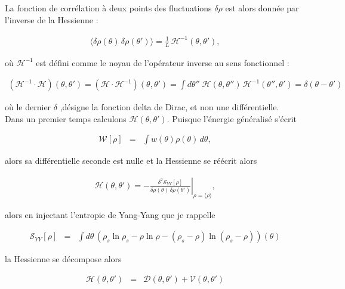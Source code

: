La fonction de corrélation à deux points des fluctuations \( \delta \rho \) est alors donnée par l’inverse de la Hessienne :

\begin{eqnarray}
    \langle \delta \rho(\theta) \, \delta \rho(\theta') \rangle = \frac{1}{L} \, \mathcal{H}^{-1}(\theta, \theta'),
    \label{chap:fluctu:eq:fluctuations}
\end{eqnarray}

où \( \mathcal{H}^{-1} \) est défini comme le noyau de l’opérateur inverse au sens fonctionnel :

\begin{eqnarray}
     (\mathcal{H}^{-1} \cdot  \mathcal{H})(\theta, \theta')  = (\mathcal{H}\cdot  \mathcal{H}^{-1})(\theta, \theta') = \int d\theta'' \; \mathcal{H}(\theta, \theta'') \, \mathcal{H}^{-1}(\theta'', \theta') = \delta(\theta - \theta')
     \label{chap:fluctu:eq:hessienner.prod.inv} 
\end{eqnarray}

où le dernier $\delta$ ,désigne la fonction delta de Dirac, et non une différentielle.\\

Dans un premier temps calculons $\mathcal{H}(\theta, \theta')$. Puisque l'énergie généralisé s'écrit

\begin{eqnarray}
	\mathcal{W}[\rho] & = & \int w(\theta) \rho(\theta) \, d \theta , 	
\end{eqnarray}

alors sa différentielle seconde est nulle et la Hessienne se réécrit alors 

\begin{eqnarray}
	\mathcal{H}(\theta, \theta') = - \left. \frac{\delta^2\mathcal{S}_{YY}[\rho]}{\delta \rho(\theta) \, \delta \rho(\theta')} \right|_{\rho = \langle \rho \rangle},		
\end{eqnarray}

alors en injectant l'entropie de Yang-Yang que je rappelle 

\begin{eqnarray}
	\mathcal{S}_{YY}[\rho] & = & \int d \theta \, \left ( \rho_s \ln \rho_s - \rho \ln \rho - ( \rho_s - \rho ) \ln ( \rho_s - \rho ) \right ) ( \theta ) 		
\end{eqnarray}

la Hessienne se décompose alors

\begin{eqnarray}
	\mathcal{H}(\theta, \theta') & = & \mathcal{D}(\theta, \theta') + \mathcal{V}(\theta, \theta')
	\label{chap:fluctu:eq:hessienne3} 	
\end{eqnarray}

